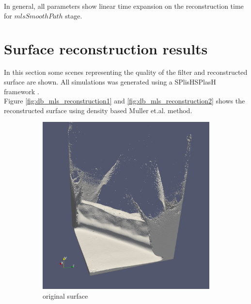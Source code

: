 In general, all parameters show linear time expansion on the reconstruction time for $mlsSmoothPath$ stage.

\section{Surface reconstruction results}
In this section some scenes representing the quality of the filter and reconstructed surface are shown. All simulations was generated using a SPlisHSPlasH framework \cite{SPlisHSPlasH}.\\
Figure \ref{fig:db_mls_reconstruction1} and \ref{fig:db_mls_reconstruction2} shows the reconstructed surface using density based Muller et.al. method. 
\begin{figure}
	\begin{center}
		\begin{subfigure}[b]{0.47\textwidth}
			\includegraphics[width=\textwidth]{figures/DDMOriginal1.png}
			\caption{original surface}
		\end{subfigure}
		\begin{subfigure}[b]{0.47\textwidth}

\end{subfigure}
\end{center}
\end{figure}
